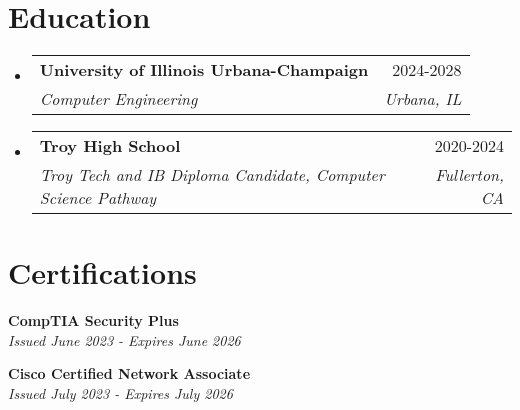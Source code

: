 \documentclass[letterpaper,11pt]{article}
\makeatletter
\newcommand{\resumeSubheading}[4]{
  \vspace{-2pt}\item
    \begin{tabular*}{0.97\textwidth}[t]{l@{\extracolsep{\fill}}r}
      \textbf{#1} & #2 \\
      \textit{\small#3} & \textit{\small #4} \\
    \end{tabular*}\vspace{-7pt}
}
\newcommand{\resumeSubHeadingListStart}{\begin{itemize}[leftmargin=0.15in, label={}]}
\newcommand{\resumeSubHeadingListEnd}{\end{itemize}}
\makeatother
\begin{document}
\section{Education}
  \resumeSubHeadingListStart
    \resumeSubheading
      {University of Illinois Urbana-Champaign}{2024-2028}
      {Computer Engineering}{Urbana, IL}
  \resumeSubHeadingListEnd
  \resumeSubHeadingListStart
    \resumeSubheading
      {Troy High School}{2020-2024}
      {Troy Tech and IB Diploma Candidate, Computer Science Pathway}{Fullerton, CA}
  \resumeSubHeadingListEnd

\section{Certifications}
  \begin{itemize}[leftmargin=0.15in, label={}]
    \small{\item{
     \textbf{CompTIA Security Plus} \\
     \textit{Issued June 2023 - Expires June 2026} \\
    }}
 \end{itemize}
\begin{itemize}[leftmargin=0.15in, label={}]
    \small{\item{
     \textbf{Cisco Certified Network Associate} \\
     \textit{Issued July 2023 - Expires July 2026} \\
    }}
 \end{itemize}

\end{document}
